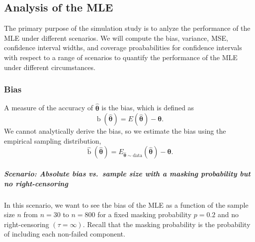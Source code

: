 \documentclass[
]{article}
\begin{document}
\hypertarget{sec:acc_prec}{%
\subsection{Analysis of the MLE}\label{sec:acc_prec}}

The primary purpose of the simulation study is to anlyze the performance
of the MLE under different scenarios. We will compute the bias,
variance, MSE, confidence interval widths, and coverage proababilities
for confidence intervals with respect to a range of scenarios to
quantify the performance of the MLE under different circumstances.

\hypertarget{bias}{%
\subsubsection{Bias}\label{bias}}

A measure of the accuracy of \(\boldsymbol{\hat\theta}\) is the bias,
which is defined as \[
\operatorname{b}(\boldsymbol{\hat\theta}) = E(\boldsymbol{\hat\theta}) - \boldsymbol{\theta}.
\] We cannot analytically derive the bias, so we estimate the bias using
the empirical sampling distribution, \[
\hat{\operatorname{b}}(\boldsymbol{\hat\theta}) =
    E_{\hat{\boldsymbol{\theta}} \sim \text{data}}(\boldsymbol{\hat\theta}) - \boldsymbol{\theta}.
\]

\hypertarget{scenario-absolute-bias-vs.-sample-size-with-a-masking-probability-but-no-right-censoring}{%
\subparagraph*{Scenario: Absolute bias vs.~sample size with a masking
probability but no
right-censoring}\label{scenario-absolute-bias-vs.-sample-size-with-a-masking-probability-but-no-right-censoring}}

In this scenario, we want to see the bias of the MLE as a function of
the sample size \(n\) from \(n = 30\) to \(n = 800\) for a fixed masking
probability \(p = 0.2\) and no right-censoring \((\tau = \infty)\).
Recall that the masking probability is the probability of including each
non-failed component.
\end{document}
